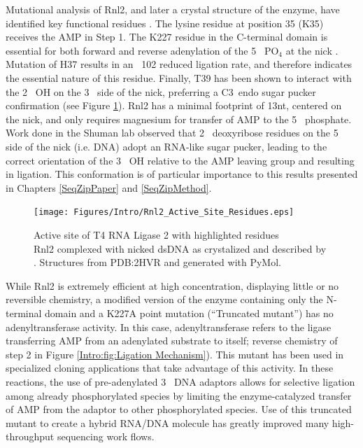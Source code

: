     Mutational analysis of Rnl2, and later a crystal structure of the enzyme, have identified key functional residues \citep{Ho2004, Nandakumar2006,Nandakumar2004a,Yin2003d}. The lysine residue at position 35 (K35) receives the AMP in Step 1. The K227 residue in the C-terminal domain is essential for both forward and reverse adenylation of the 5\textprime~ PO$_4$ at the nick \citep{Viollet2011}. Mutation of H37 results in an ~102 reduced ligation rate, and therefore indicates the essential nature of this residue. Finally, T39 has been shown to interact with the 2\textprime~ OH on the 3\textprime~ side of the nick, preferring a C3\textprime~endo sugar pucker confirmation (see Figure \ref{Intro:fig:Rnl2 Active Site Residues}). Rnl2 has a minimal footprint of 13nt, centered on the nick, and only requires magnesium for transfer of AMP to the 5\textprime~ phosphate. Work done in the Shuman lab \citep{Nandakumar2006} observed that 2\textprime~ deoxyribose residues on the 5\textprime~ side of the nick (i.e. DNA) adopt an RNA-like sugar pucker, leading to the correct orientation of the 3\textprime~ OH relative to the AMP leaving group and resulting in ligation. This conformation is of particular importance to this results presented in Chapters \ref{SeqZipPaper} and \ref{SeqZipMethod}.

    \begin{figure} %
      \centering 
      \texttt{[image: Figures/Intro/Rnl2\_Active\_Site\_Residues.eps]}
      \caption[Active site of T4 RNA Ligase 2 with highlighted residues]
      {
        Active site of T4 RNA Ligase 2 with highlighted residues\\[0.25cm]
        Rnl2 complexed with nicked dsDNA as crystalized and described by \citep{Nandakumar2006}. Structures from PDB:2HVR and generated with PyMol.
        }
      \label{Intro:fig:Rnl2 Active Site Residues}
      \end{figure}

    While Rnl2 is extremely efficient at high concentration, displaying little or no reversible chemistry, a modified version of the enzyme containing only the N-terminal domain and a K227A point mutation (“Truncated mutant”) has no adenyltransferase activity. In this case, adenyltransferase refers to the ligase transferring AMP from an adenylated substrate to itself; reverse chemistry of step 2 in Figure \ref{Intro:fig:Ligation Mechanism}). This mutant has been used in specialized cloning applications \citep{Ghildiyal2008, Hafner2008a, Viollet2011} that take advantage of this activity. In these reactions, the use of pre-adenylated 3\textprime~ DNA adaptors allows for selective ligation among already phosphorylated species by limiting the enzyme-catalyzed transfer of AMP from the adaptor to other phosphorylated species. Use of this truncated mutant to create a hybrid RNA/DNA molecule has greatly improved many high-throughput sequencing work flows.

